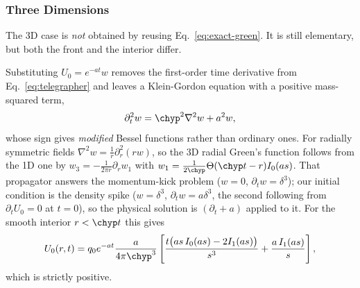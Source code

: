 \subsubsection{Three Dimensions}
\label{sec:exact-3d}

The 3D case is \emph{not} obtained by reusing Eq.~\eqref{eq:exact-green}.
It is still elementary, but both the front and the interior differ.

Substituting $U_0=e^{-at}w$ removes the first-order time derivative from
Eq.~\eqref{eq:telegrapher} and leaves a Klein-Gordon equation with a
positive mass-squared term,
\begin{equation}
  \label{eq:kg}
  \partial_t^2w = \chyp^2\nabla^2w + a^2w ,
\end{equation}
whose sign gives \emph{modified} Bessel functions rather than ordinary
ones. For radially symmetric fields $\nabla^2w=\tfrac1r\partial_r^2(rw)$,
so the 3D radial Green's function follows from the 1D one by
$w_3=-\tfrac{1}{2\pi r}\partial_rw_1$ with
$w_1=\tfrac{1}{2\chyp}\Theta(\chyp t-r)I_0(as)$. That propagator answers
the momentum-kick problem ($w=0$, $\partial_tw=\delta^3$); our initial
condition is the density spike ($w=\delta^3$, $\partial_tw=a\delta^3$,
the second following from $\partial_tU_0=0$ at $t=0$), so the physical
solution is $(\partial_t+a)$ applied to it. For the smooth interior $r<\chyp t$ this
gives
\begin{equation}
  \label{eq:U3d-smooth}
  U_0(r,t) = q_0e^{-at}\frac{a}{4\pi\chyp^3}\left[
    \frac{t\big(as\,I_0(as)-2I_1(as)\big)}{s^3}
    + \frac{a\,I_1(as)}{s}\right] ,
\end{equation}
which is strictly positive.

